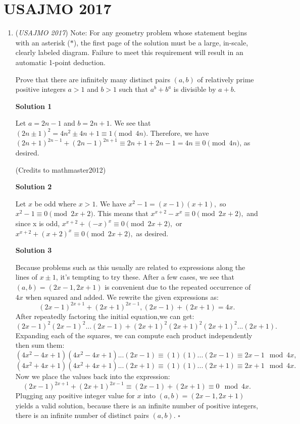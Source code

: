 \section{USAJMO 2017}
        \begin{enumerate}
        	\item (\textit{USAJMO 2017}) Note: For any geometry problem whose statement begins with an asterisk ($*$), the first page of the solution must be a large, in-scale, clearly labeled diagram. Failure to meet this requirement will result in an automatic 1-point deduction. 


 Prove that there are infinitely many distinct pairs $(a,b)$ of relatively prime positive integers $a > 1$ and $b > 1$ such that $a^b + b^a$ is divisible by $a + b.$




\textbf{Solution 1}

Let $a = 2n-1$ and $b = 2n+1$. We see that $(2n \pm 1)^2 = 4n^2\pm4n+1 \equiv 1 \pmod{4n}$. Therefore, we have $(2n+1)^{2n-1} + (2n-1)^{2n+1} \equiv 2n + 1 + 2n - 1  = 4n \equiv 0 \pmod{4n}$, as desired. 

 (Credits to mathmaster2012)

 



\textbf{Solution 2}

Let $x$ be odd where $x>1$. We have $x^2-1=(x-1)(x+1),$ so $x^2-1 \equiv 0 \pmod{2x+2}.$ This means that  $x^{x+2}-x^x \equiv 0 \pmod{2x+2},$ and since x is odd, $x^{x+2}+(-x)^x \equiv 0 \pmod{2x+2},$ or $x^{x+2}+(x+2)^x \equiv 0 \pmod{2x+2},$ as desired.

 



\textbf{Solution 3}

Because problems such as this usually are related to expressions along the lines of $x\pm1$, it's tempting to try these. After a few cases, we see that $\left(a,b\right)=\left(2x-1,2x+1\right)$ is convenient due to the repeated occurrence of $4x$ when squared and added. We rewrite the given expressions as: 
 \[\left(2x-1\right)^{2x+1}+\left(2x+1\right)^{2x-1}, \left(2x-1\right)+\left(2x+1\right)=4x.\] After repeatedly factoring the initial equation,we can get: 
 \[\left(2x-1\right)^{2}\left(2x-1\right)^{2}...\left(2x-1\right)+\left(2x+1\right)^{2}\left(2x+1\right)^{2}\left(2x+1\right)^{2}...\left(2x+1\right).\] Expanding each of the squares, we can compute each product independently then sum them: 
 \[\left(4x^{2}-4x+1\right)\left(4x^{2}-4x+1\right)...\left(2x-1\right)\equiv\left(1\right)\left(1\right)...\left(2x-1\right)\equiv2x-1\mod{4x},\] 
 \[\left(4x^{2}+4x+1\right)\left(4x^{2}+4x+1\right)...\left(2x+1\right)\equiv\left(1\right)\left(1\right)...\left(2x+1\right)\equiv2x+1\mod{4x}.\] Now we place the values back into the expression: 
 \[\left(2x-1\right)^{2x+1}+\left(2x+1\right)^{2x-1}\equiv\left(2x-1\right)+\left(2x+1\right)\equiv0\mod{4x}.\] Plugging any positive integer value for $x$ into $\left(a,b\right)=\left(2x-1,2x+1\right)$ yields a valid solution, because there is an infinite number of positive integers, there is an infinite number of distinct pairs $\left(a,b\right)$. $\square$


\end{enumerate}
